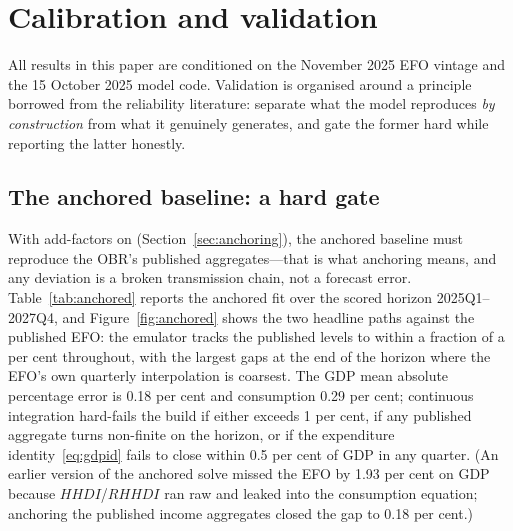 \section{Calibration and validation}
\label{sec:calibration}

All results in this paper are conditioned on the November 2025 EFO vintage \citep{obr2025efo} and the 15 October 2025 model code. Validation is organised around a principle borrowed from the reliability literature: separate what the model reproduces \emph{by construction} from what it genuinely generates, and gate the former hard while reporting the latter honestly.

\subsection{The anchored baseline: a hard gate}

With add-factors on (Section~\ref{sec:anchoring}), the anchored baseline must reproduce the OBR's published aggregates---that is what anchoring means, and any deviation is a broken transmission chain, not a forecast error. Table~\ref{tab:anchored} reports the anchored fit over the scored horizon 2025Q1--2027Q4, and Figure~\ref{fig:anchored} shows the two headline paths against the published EFO: the emulator tracks the published levels to within a fraction of a per cent throughout, with the largest gaps at the end of the horizon where the EFO's own quarterly interpolation is coarsest. The GDP mean absolute percentage error is 0.18 per cent and consumption 0.29 per cent; continuous integration hard-fails the build if either exceeds 1 per cent, if any published aggregate turns non-finite on the horizon, or if the expenditure identity~\eqref{eq:gdpid} fails to close within 0.5 per cent of GDP in any quarter. (An earlier version of the anchored solve missed the EFO by 1.93 per cent on GDP because $HHDI$/$RHHDI$ ran raw and leaked into the consumption equation; anchoring the published income aggregates closed the gap to 0.18 per cent.)


